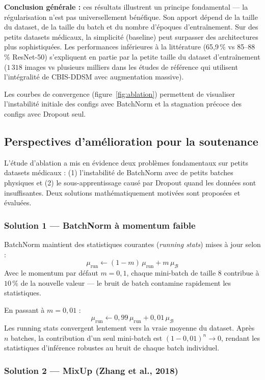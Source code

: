 \documentclass[a4paper,10pt]{article}
\begin{document}
\textbf{Conclusion générale :} ces résultats illustrent un principe fondamental —
la régularisation n'est pas universellement bénéfique. Son apport dépend de la taille du
dataset, de la taille du batch et du nombre d'époques d'entraînement.
Sur des petits datasets médicaux, la simplicité (baseline) peut surpasser des architectures
plus sophistiquées. Les performances inférieures à la littérature (65,9\,\% vs 85--88\,\% ResNet-50)
s'expliquent en partie par la petite taille du dataset d'entraînement
($1\,318$ images vs plusieurs milliers dans les études de référence qui utilisent
l'intégralité de CBIS-DDSM avec augmentation massive).

Les courbes de convergence (figure~\ref{fig:ablation}) permettent de visualiser l'instabilité
initiale des configs avec BatchNorm et la stagnation précoce des configs avec Dropout seul.

\subsection{Perspectives d'amélioration pour la soutenance}

L'étude d'ablation a mis en évidence deux problèmes fondamentaux sur petits datasets médicaux :
(1) l'instabilité de BatchNorm avec de petits batches physiques et
(2) le sous-apprentissage causé par Dropout quand les données sont insuffisantes.
Deux solutions mathématiquement motivées sont proposées et évaluées.

\subsubsection*{Solution 1 — BatchNorm à momentum faible}

BatchNorm maintient des statistiques courantes (\textit{running stats}) mises à jour selon :
\[
\mu_{\text{run}} \leftarrow (1 - m)\,\mu_{\text{run}} + m\,\mu_\mathcal{B}
\]
Avec le momentum par défaut $m = 0{,}1$, chaque mini-batch de taille 8 contribue à
$10\,\%$ de la nouvelle valeur — le bruit de batch contamine rapidement les statistiques.

En passant à $m = 0{,}01$ :
\[
\mu_{\text{run}} \leftarrow 0{,}99\,\mu_{\text{run}} + 0{,}01\,\mu_\mathcal{B}
\]
Les running stats convergent lentement vers la vraie moyenne du dataset.
Après $n$ batches, la contribution d'un seul mini-batch est $(1-0{,}01)^n \to 0$,
rendant les statistiques d'inférence robustes au bruit de chaque batch individuel.

\subsubsection*{Solution 2 — MixUp (Zhang et al., 2018)}
\end{document}
